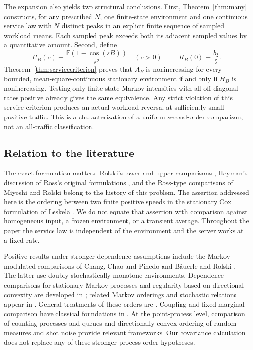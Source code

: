 \documentclass[11pt,reqno]{amsart}
\numberwithin{equation}{section}
\theoremstyle{plain}
\theoremstyle{definition}
\newcommand{\E}{\mathbb E}
\newcommand{\1}{\mathbf 1}
\begin{document}
The expansion also yields two structural conclusions. First, Theorem~\ref{thm:many} constructs, for any prescribed $N$, one finite-state environment and one continuous service law with $N$ distinct peaks in an explicit finite sequence of sampled workload means. Each sampled peak exceeds both its adjacent sampled values by a quantitative amount. Second, define
\begin{equation}\label{eq:Hintro}
 H_B(s)=\frac{\E(1-\cos(sB))}{s^2}\quad(s>0),
 \qquad H_B(0)=\frac{b_2}{2}.
\end{equation}
Theorem~\ref{thm:servicecriterion} proves that $A_B$ is nonincreasing for every bounded, mean-square-continuous stationary environment if and only if $H_B$ is nonincreasing. Testing only finite-state Markov intensities with all off-diagonal rates positive already gives the same equivalence. Any strict violation of this service criterion produces an actual workload reversal at sufficiently small positive traffic. This is a characterization of a uniform second-order comparison, not an all-traffic classification.

\subsection{Relation to the literature}
The exact formulation matters. Rolski's lower and upper comparisons \cite{Rolski81,Rolski86}, Heyman's discussion of Ross's original formulations \cite{Heyman82}, and the Ross-type comparisons of Miyoshi and Rolski \cite{MR04} belong to the history of this problem. The assertion addressed here is the ordering between two finite positive speeds in the stationary Cox formulation of Leskel\"a \cite{Leskela22}. We do not equate that assertion with comparison against homogeneous input, a frozen environment, or a transient average. Throughout the paper the service law is independent of the environment and the server works at a fixed rate.

Positive results under stronger dependence assumptions include the Markov-modulated comparisons of Chang, Chao and Pinedo \cite{CCP91} and B\"auerle and Rolski \cite{BR98}. The latter use doubly stochastically monotone environments. Dependence comparisons for stationary Markov processes and regularity based on directional convexity are developed in \cite{HuPan00,MS93}; related Markov orderings and stochastic relations appear in \cite{Massey87,Leskela10}. General treatments of these orders are \cite{MullerStoyan02,ShakedShanthikumar07}. Coupling and fixed-marginal comparison have classical foundations in \cite{Strassen65,Tchen80}. At the point-process level, comparison of counting processes and queues \cite{Whitt81} and directionally convex ordering of random measures and shot noise \cite{BY09} provide relevant frameworks. Our covariance calculation does not replace any of these stronger process-order hypotheses.
\end{document}
